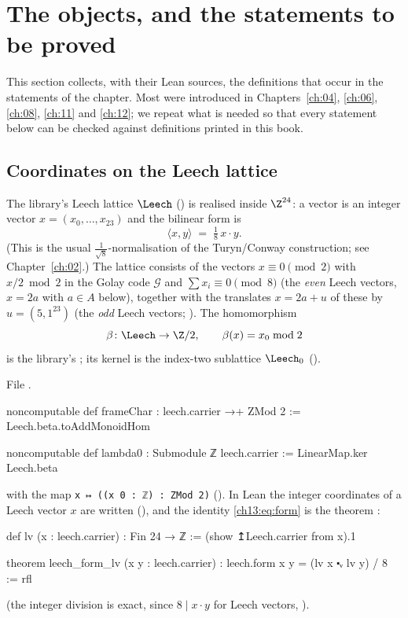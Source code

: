 \section{The objects, and the statements to be proved}\label{ch13:sec:recap}

This section collects, with their Lean sources, the definitions that occur in the statements of
the chapter. Most were introduced in Chapters~\ref{ch:04}, \ref{ch:06}, \ref{ch:08}, \ref{ch:11}
and \ref{ch:12}; we repeat what is needed so that every statement below can be checked against
definitions printed in this book.

\subsection{Coordinates on the Leech lattice}\label{ch13:ssec:coords}

The library's Leech lattice $\Leech$ () is realised inside $\Z^{24}$: a vector is an
integer vector $x=(x_0,\dots,x_{23})$ and the bilinear form is
\begin{equation}\label{ch13:eq:form}
  \langle x,y\rangle \;=\; \tfrac18\,x\cdot y .
\end{equation}
(This is the usual $\tfrac1{\sqrt8}$-normalisation of the Turyn/Conway construction; see
Chapter~\ref{ch:02}.) The lattice consists of the vectors $x\equiv 0\pmod 2$ with
$x/2 \bmod 2$ in the Golay code $\mathcal G$ and $\sum x_i\equiv0\pmod 8$ (the \emph{even} Leech
vectors, $x=2a$ with $a\in A$ below), together with the translates $x=2a+u$ of these by
$u=(5,1^{23})$ (the \emph{odd} Leech vectors; ). The homomorphism
\begin{equation*}
  \beta\colon \Leech\to\Z/2,\qquad \beta(x)=x_0 \bmod 2
\end{equation*}
is the library's ; its kernel is the index-two sublattice $\Leech_0$
().

\noindent File .
\begin{leancode}
noncomputable def frameChar : leech.carrier →+ ZMod 2 := Leech.beta.toAddMonoidHom

noncomputable def lambda0 : Submodule ℤ leech.carrier := LinearMap.ker Leech.beta
\end{leancode}
with  the map \texttt{x ↦ ((x 0 : ℤ) : ZMod 2)}
(). In Lean the integer coordinates of a Leech
vector $x$ are written  (), and the identity
\eqref{ch13:eq:form} is the theorem :
\begin{leancode}
def lv (x : leech.carrier) : Fin 24 → ℤ := (show ↥Leech.carrier from x).1

theorem leech_form_lv (x y : leech.carrier) : leech.form x y = (lv x ⬝ᵥ lv y) / 8 := rfl
\end{leancode}
(the integer division is exact, since $8\mid x\cdot y$ for Leech vectors, ).

